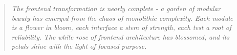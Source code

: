 \documentclass[11pt]{article}
\begin{document}
\begin{quote}
\emph{The frontend transformation is nearly complete - a garden of modular beauty has emerged from the chaos of monolithic complexity. Each module is a flower in bloom, each interface a stem of strength, each test a root of reliability. The white rose of frontend architecture has blossomed, and its petals shine with the light of focused purpose.}
\end{quote}
\end{document}
